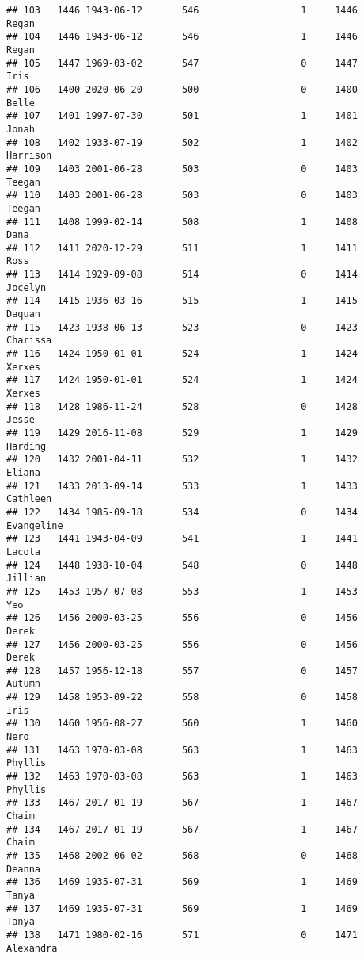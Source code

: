 \documentclass[
]{article}
\begin{document}
\begin{verbatim}
## 103   1446 1943-06-12       546                  1     1446      Regan
## 104   1446 1943-06-12       546                  1     1446      Regan
## 105   1447 1969-03-02       547                  0     1447       Iris
## 106   1400 2020-06-20       500                  0     1400      Belle
## 107   1401 1997-07-30       501                  1     1401      Jonah
## 108   1402 1933-07-19       502                  1     1402   Harrison
## 109   1403 2001-06-28       503                  0     1403     Teegan
## 110   1403 2001-06-28       503                  0     1403     Teegan
## 111   1408 1999-02-14       508                  1     1408       Dana
## 112   1411 2020-12-29       511                  1     1411       Ross
## 113   1414 1929-09-08       514                  0     1414    Jocelyn
## 114   1415 1936-03-16       515                  1     1415     Daquan
## 115   1423 1938-06-13       523                  0     1423   Charissa
## 116   1424 1950-01-01       524                  1     1424     Xerxes
## 117   1424 1950-01-01       524                  1     1424     Xerxes
## 118   1428 1986-11-24       528                  0     1428      Jesse
## 119   1429 2016-11-08       529                  1     1429    Harding
## 120   1432 2001-04-11       532                  1     1432     Eliana
## 121   1433 2013-09-14       533                  1     1433   Cathleen
## 122   1434 1985-09-18       534                  0     1434 Evangeline
## 123   1441 1943-04-09       541                  1     1441     Lacota
## 124   1448 1938-10-04       548                  0     1448    Jillian
## 125   1453 1957-07-08       553                  1     1453        Yeo
## 126   1456 2000-03-25       556                  0     1456      Derek
## 127   1456 2000-03-25       556                  0     1456      Derek
## 128   1457 1956-12-18       557                  0     1457     Autumn
## 129   1458 1953-09-22       558                  0     1458       Iris
## 130   1460 1956-08-27       560                  1     1460       Nero
## 131   1463 1970-03-08       563                  1     1463    Phyllis
## 132   1463 1970-03-08       563                  1     1463    Phyllis
## 133   1467 2017-01-19       567                  1     1467      Chaim
## 134   1467 2017-01-19       567                  1     1467      Chaim
## 135   1468 2002-06-02       568                  0     1468     Deanna
## 136   1469 1935-07-31       569                  1     1469      Tanya
## 137   1469 1935-07-31       569                  1     1469      Tanya
## 138   1471 1980-02-16       571                  0     1471  Alexandra

\end{verbatim}
\end{document}
